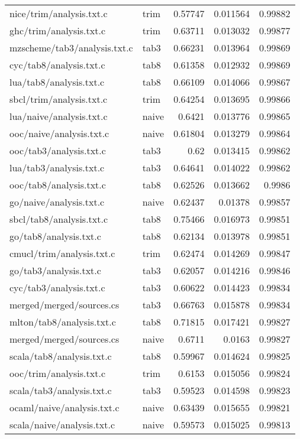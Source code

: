 \begin{longtable}{l l r r r}
{nice/trim/analysis.txt.c} & trim & 0.57747 & 0.011564 & 0.99882 \\
{ghc/trim/analysis.txt.c} & trim & 0.63711 & 0.013032 & 0.99877 \\
{mzscheme/tab3/analysis.txt.c} & tab3 & 0.66231 & 0.013964 & 0.99869 \\
{cyc/tab8/analysis.txt.c} & tab8 & 0.61358 & 0.012932 & 0.99869 \\
{lua/tab8/analysis.txt.c} & tab8 & 0.66109 & 0.014066 & 0.99867 \\
{sbcl/trim/analysis.txt.c} & trim & 0.64254 & 0.013695 & 0.99866 \\
{lua/naive/analysis.txt.c} & naive & 0.6421 & 0.013776 & 0.99865 \\
{ooc/naive/analysis.txt.c} & naive & 0.61804 & 0.013279 & 0.99864 \\
{ooc/tab3/analysis.txt.c} & tab3 & 0.62 & 0.013415 & 0.99862 \\
{lua/tab3/analysis.txt.c} & tab3 & 0.64641 & 0.014022 & 0.99862 \\
{ooc/tab8/analysis.txt.c} & tab8 & 0.62526 & 0.013662 & 0.9986 \\
{go/naive/analysis.txt.c} & naive & 0.62437 & 0.01378 & 0.99857 \\
{sbcl/tab8/analysis.txt.c} & tab8 & 0.75466 & 0.016973 & 0.99851 \\
{go/tab8/analysis.txt.c} & tab8 & 0.62134 & 0.013978 & 0.99851 \\
{cmucl/trim/analysis.txt.c} & trim & 0.62474 & 0.014269 & 0.99847 \\
{go/tab3/analysis.txt.c} & tab3 & 0.62057 & 0.014216 & 0.99846 \\
{cyc/tab3/analysis.txt.c} & tab3 & 0.60622 & 0.014423 & 0.99834 \\
{merged/merged/sources.cs} & tab3 & 0.66763 & 0.015878 & 0.99834 \\
{mlton/tab8/analysis.txt.c} & tab8 & 0.71815 & 0.017421 & 0.99827 \\
{merged/merged/sources.cs} & naive & 0.6711 & 0.0163 & 0.99827 \\
{scala/tab8/analysis.txt.c} & tab8 & 0.59967 & 0.014624 & 0.99825 \\
{ooc/trim/analysis.txt.c} & trim & 0.6153 & 0.015056 & 0.99824 \\
{scala/tab3/analysis.txt.c} & tab3 & 0.59523 & 0.014598 & 0.99823 \\
{ocaml/naive/analysis.txt.c} & naive & 0.63439 & 0.015655 & 0.99821 \\
{scala/naive/analysis.txt.c} & naive & 0.59573 & 0.015025 & 0.99813 \\

\end{longtable}
